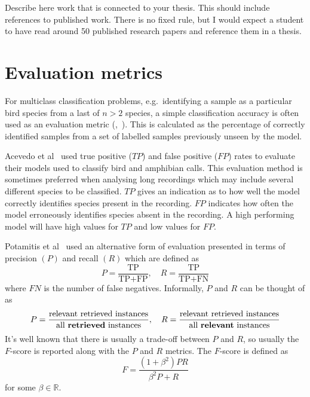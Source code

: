 Describe here work that is connected to your thesis. This should include
references to published work. There is no fixed rule, but I would expect a
student to have read around 50 published research papers and reference them in a
thesis.

\section{Evaluation metrics}\label{sec:eval_metrics}

For multiclass classification problems, e.g.\ identifying a sample as a
particular bird species from a last of $n > 2$ species, a simple classification
accuracy is often used as an evaluation metric
(\cite{chakraborty2016bird},~\cite{ramashini2022robust}). This is calculated as
the percentage of correctly identified samples from a set of labelled samples
previously unseen by the model.

Acevedo et al~\cite{acevedo2009automated} used true positive ($TP$) and false
positive ($FP$) rates to evaluate their models used to classify bird and amphibian
calls. This evaluation method is sometimes preferred when analysing long
recordings which may include several different species to be classified. $TP$
gives an indication as to how well the model correctly identifies species
present in the recording. $FP$ indicates how often the model erroneously
identifies species absent in the recording. A high performing model will have
high values for $TP$ and low values for $FP$\@.

Potamitis et al~\cite{potamitis2014automatic} used an alternative form of
evaluation presented in terms of precision $(P)$ and recall $(R)$ which are
defined as
\begin{equation}
  P = \frac{\text{TP}}{\text{TP}+\text{FP}}, \hspace{1em}
  R = \frac{\text{TP}}{\text{TP}+\text{FN}}
\end{equation}
where $FN$ is the number of false negatives. Informally, $P$ and $R$ can be
thought of as
\begin{equation}
  P = \frac{\text{relevant retrieved instances}}{\text{all \textbf{retrieved} instances}}, \hspace{1em}
  R = \frac{\text{relevant retrieved instances}}{\text{all \textbf{relevant} instances}}
\end{equation}
It's well known that there is usually a trade-off between $P$ and $R$, so
usually the $F$-score is reported along with the $P$ and $R$ metrics. The
$F$-score is defined as
\begin{equation}
F = \frac{(1+\beta^2)PR}{\beta^2P + R}
\end{equation}
for some $\beta \in \mathbb{R}$.

